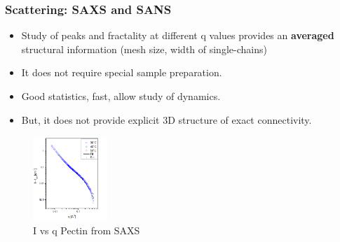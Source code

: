 \documentclass[9pt]{beamer}
\begin{document}
\begin{frame}
  \frametitle{Scattering: SAXS and SANS}
  \begin{itemize}
    \item Study of peaks and fractality at different q values provides an \textbf{averaged} structural information (mesh size, width of single-chains)
    \item It does not require special sample preparation.
    \item Good statistics, fast, allow study of dynamics.
    \item \alert{But}, it does not provide explicit 3D structure of exact connectivity.
  \end{itemize}
    \begin{figure}[htpb]
      \includegraphics[width=0.25\textwidth]{./Figures/saxs_pectin.png}
      \caption*{\footnotesize{I vs q Pectin from SAXS}}
    \end{figure}
\end{frame}
\end{document}
